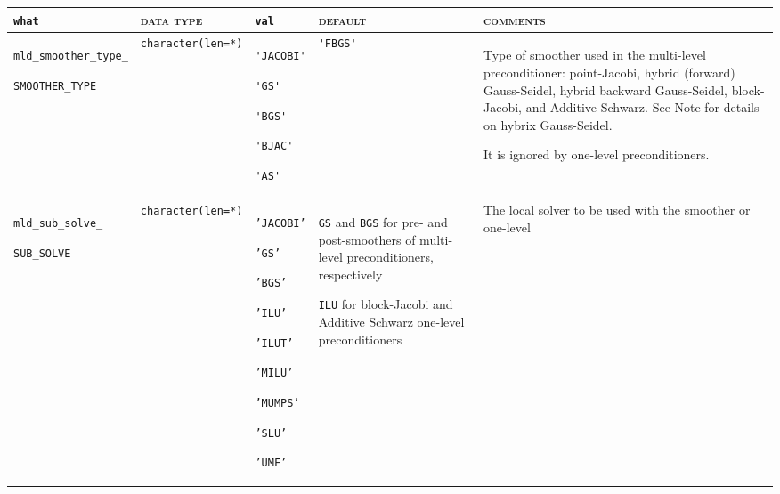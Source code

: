 \bsideways
\begin{center}
\small
\begin{tabular}{|p{3.6cm}|l|p{1.9cm}|p{3.6cm}|p{6.5cm}|}
\hline
\verb|what|              & \textsc{data type}        &  \verb|val|      &  \textsc{default}  &
\textsc{comments} \\ \hline
\verb|mld_smoother_type_|  \par \verb|SMOOTHER_TYPE|  & \verb|character(len=*)|
                         & \verb|'JACOBI'| \par \verb|'GS'| \par \verb|'BGS'| \par \verb|'BJAC'|
                            \par \verb|'AS'|
                         & \verb|'FBGS'|
                         & Type of smoother used in the multi-level preconditioner:
                            point-Jacobi, hybrid (forward) Gauss-Seidel,
                            hybrid backward Gauss-Seidel, block-Jacobi, and
                            Additive Schwarz. See Note for details on hybrix Gauss-Seidel.\par
                            It is ignored by one-level preconditioners. \\ \hline
\verb|mld_sub_solve_| \par \verb|SUB_SOLVE|  & \verb|character(len=*)|
                         & \texttt{'JACOBI'} \par
                           \texttt{'GS'} \par \texttt{'BGS'} \par \texttt{'ILU'} \par 
                           \texttt{'ILUT'} \par \texttt{'MILU'} \par 
                           \par \texttt{'MUMPS'} \par \texttt{'SLU'} \par \texttt{'UMF'}
                         & \texttt{GS} and \texttt{BGS} for pre- and post-smoothers
                            of multi-level preconditioners, respectively \par
                            \texttt{ILU} for block-Jacobi and Additive Schwarz
                            one-level preconditioners
                         & The local solver to be used with the smoother or one-level

\end{tabular}
\end{center}

